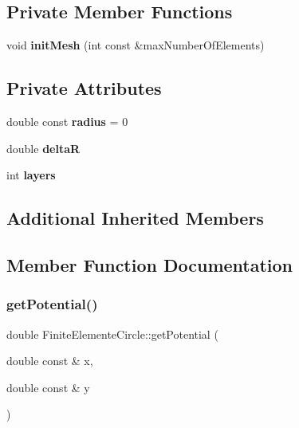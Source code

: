 \subsection*{Private Member Functions}
\begin{DoxyCompactItemize}
\item 
\mbox{\label{classFiniteElementeCircle_a479d6d3986a14d7011c3fa68a954d13b}} 
void {\bfseries init\+Mesh} (int const \&max\+Number\+Of\+Elements)
\end{DoxyCompactItemize}
\subsection*{Private Attributes}
\begin{DoxyCompactItemize}
\item 
\mbox{\label{classFiniteElementeCircle_a9a16f2a7c9383994e39932eaff07e9a0}} 
double const {\bfseries radius} = 0
\item 
\mbox{\label{classFiniteElementeCircle_ac7e96d30db2e6f97c43cde584d42cb76}} 
double {\bfseries deltaR}
\item 
\mbox{\label{classFiniteElementeCircle_a2541895ba79ed701ee3b860f6a252e1e}} 
int {\bfseries layers}
\end{DoxyCompactItemize}
\subsection*{Additional Inherited Members}


\subsection{Member Function Documentation}
\mbox{\label{classFiniteElementeCircle_a832520dcd5db9bd2845ad3c781749a69}} 
\subsubsection{\texorpdfstring{get\+Potential()}{getPotential()}}
{\footnotesize\ttfamily double Finite\+Elemente\+Circle\+::get\+Potential (\begin{DoxyParamCaption}\item[{double const \&}]{x,  }\item[{double const \&}]{y }\end{DoxyParamCaption})\hspace{0.3cm}{\ttfamily [virtual]}}

